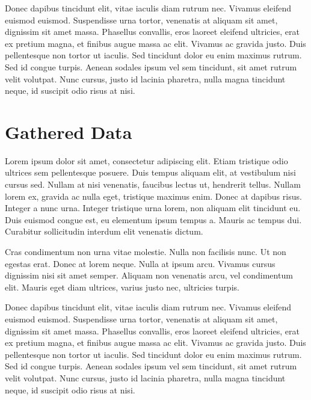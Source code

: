 \documentclass[11pt, a4paper]{resources/JTH}
\begin{document}
Donec dapibus tincidunt elit, vitae iaculis diam rutrum nec. Vivamus eleifend euismod euismod. Suspendisse urna tortor, venenatis at aliquam sit amet, dignissim sit amet massa. Phasellus convallis, eros laoreet eleifend ultricies, erat ex pretium magna, et finibus augue massa ac elit. Vivamus ac gravida justo. Duis pellentesque non tortor ut iaculis. Sed tincidunt dolor eu enim maximus rutrum. Sed id congue turpis. Aenean sodales ipsum vel sem tincidunt, sit amet rutrum velit volutpat. Nunc cursus, justo id lacinia pharetra, nulla magna tincidunt neque, id suscipit odio risus at nisi.




\appendix

\chapter{Gathered Data}
\label{chap:data}

Lorem ipsum dolor sit amet, consectetur adipiscing elit. Etiam tristique odio ultrices sem pellentesque posuere. Duis tempus aliquam elit, at vestibulum nisi cursus sed. Nullam at nisi venenatis, faucibus lectus ut, hendrerit tellus. Nullam lorem ex, gravida ac nulla eget, tristique maximus enim. Donec at dapibus risus. Integer a nunc urna. Integer tristique urna lorem, non aliquam elit tincidunt eu. Duis euismod congue est, eu elementum ipsum tempus a. Mauris ac tempus dui. Curabitur sollicitudin interdum elit venenatis dictum.

Cras condimentum non urna vitae molestie. Nulla non facilisis nunc. Ut non egestas erat. Donec at lorem neque. Nulla at ipsum arcu. Vivamus cursus dignissim nisi sit amet semper. Aliquam non venenatis arcu, vel condimentum elit. Mauris eget diam ultrices, varius justo nec, ultricies turpis.

Donec dapibus tincidunt elit, vitae iaculis diam rutrum nec. Vivamus eleifend euismod euismod. Suspendisse urna tortor, venenatis at aliquam sit amet, dignissim sit amet massa. Phasellus convallis, eros laoreet eleifend ultricies, erat ex pretium magna, et finibus augue massa ac elit. Vivamus ac gravida justo. Duis pellentesque non tortor ut iaculis. Sed tincidunt dolor eu enim maximus rutrum. Sed id congue turpis. Aenean sodales ipsum vel sem tincidunt, sit amet rutrum velit volutpat. Nunc cursus, justo id lacinia pharetra, nulla magna tincidunt neque, id suscipit odio risus at nisi.
\end{document}
